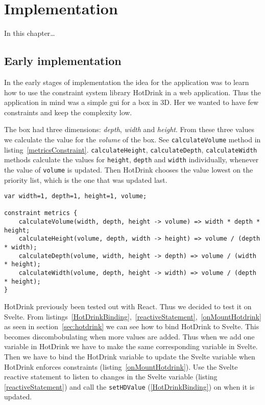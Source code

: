 \chapter{Implementation}

In this chapter…

\section{Early implementation}

In the early stages of implementation the idea for the application was to learn how 
to use the constraint system library HotDrink in a web application. Thus the 
application in mind was a simple \gls{gui} for a box in 3D. Her we wanted to have few 
constraints and keep the complexity low. 

The box had three dimensions: \textit{depth}, \textit{width} and \textit{height}. From 
these three values we calculate the value for the \textit{volume} of the box. See 
\texttt{calculateVolume} method in listing~\ref{metricsConstraint}. 
\texttt{calculateHeight}, \texttt{calculateDepth}, \texttt{calculateWidth} methods 
calculate the values for \texttt{height}, \texttt{depth} and \texttt{width} individually, 
whenever the value of \texttt{volume} is updated. Then HotDrink chooses the value lowest on the 
priority list, which is the one that was updated last.

\begin{lstlisting}[caption={Example of the constraint calculating the values of the box},label=metricsConstraint, language=hotdrink]
var width=1, depth=1, height=1, volume;

constraint metrics {
    calculateVolume(width, depth, height -> volume) => width * depth * height;
    calculateHeight(volume, depth, width -> height) => volume / (depth * width);
    calculateDepth(volume, width, height -> depth) => volume / (width * height);
    calculateWidth(volume, depth, height -> width) => volume / (depth * height);
}
\end{lstlisting}

HotDrink previously been tested out with React. Thus we decided to test it on Svelte. 
From listings~\ref{HotDrinkBinding},~\ref{reactiveStatement},~\ref{onMountHotdrink} 
as seen in section~\ref{sec:hotdrink} we can see how to bind HotDrink to Svelte. This 
becomes discombobulating when more values are added. Thus when we add one variable in 
HotDrink we have to make the same corresponding variable in Svelte. Then we have to 
bind the HotDrink variable to update the Svelte variable when HotDrink enforces 
constraints (listing~\ref{onMountHotdrink}). Use the Svelte reactive statement to 
listen to changes in the Svelte variable (listing \ref{reactiveStatement}) and call 
the \texttt{setHDValue} (\ref{HotDrinkBinding}) on when it is updated.

